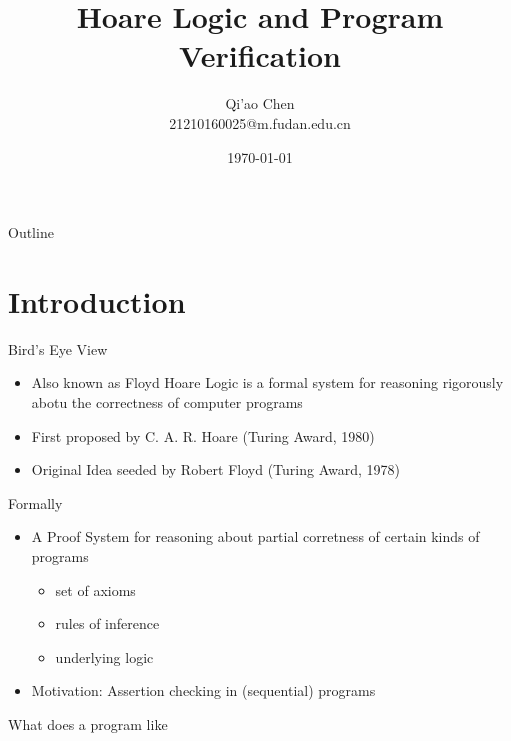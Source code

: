 \documentclass[presentation]{beamer}
\author{Qi'ao Chen\\21210160025@m.fudan.edu.cn}
\date{\today}
\title{Hoare Logic and Program Verification}
\begin{document}
\maketitle
\begin{frame}{Outline}
\tableofcontents
\end{frame}

\section{Introduction}
\label{sec:org675ebdb}
\begin{frame}[label={sec:orgbc8549e}]{Bird's Eye View}
\begin{itemize}
\item Also known as \alert{Floyd Hoare Logic} is a formal system for reasoning rigorously abotu the
correctness of computer programs
\item First proposed by C. A. R. Hoare (Turing Award, 1980)
\item Original Idea seeded by Robert Floyd (Turing Award, 1978)
\end{itemize}
\end{frame}
\begin{frame}[label={sec:org14cf818}]{Formally}
\begin{itemize}
\item A Proof System for reasoning about \alert{partial corretness} of certain kinds of programs
\begin{itemize}
\item set of axioms
\item rules of inference
\item underlying logic
\end{itemize}
\item \alert{Motivation}: Assertion checking in (sequential) programs
\end{itemize}
\end{frame}
\begin{frame}[label={sec:orgcae9782},fragile]{What does a program like}
\end{frame}
\end{document}
